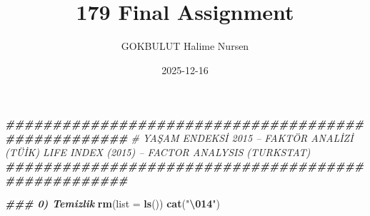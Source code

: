 \documentclass[
]{article}
\title{179 Final Assignment}
\author{GOKBULUT Halime Nursen}
\date{2025-12-16}
\newenvironment{Shaded}{\begin{snugshade}}{\end{snugshade}}
\newcommand{\AttributeTok}[1]{\textcolor[rgb]{0.13,0.29,0.53}{#1}}
\newcommand{\CommentTok}[1]{\textcolor[rgb]{0.56,0.35,0.01}{\textit{#1}}}
\newcommand{\DocumentationTok}[1]{\textcolor[rgb]{0.56,0.35,0.01}{\textbf{\textit{#1}}}}
\newcommand{\FunctionTok}[1]{\textcolor[rgb]{0.13,0.29,0.53}{\textbf{#1}}}
\newcommand{\NormalTok}[1]{#1}
\newcommand{\SpecialCharTok}[1]{\textcolor[rgb]{0.81,0.36,0.00}{\textbf{#1}}}
\newcommand{\StringTok}[1]{\textcolor[rgb]{0.31,0.60,0.02}{#1}}
\begin{document}
\maketitle

\begin{Shaded}
\begin{Highlighting}[]
\DocumentationTok{\#\#\#\#\#\#\#\#\#\#\#\#\#\#\#\#\#\#\#\#\#\#\#\#\#\#\#\#\#\#\#\#\#\#\#\#\#\#\#\#\#\#\#\#\#\#\#\#\#\#\#}
\CommentTok{\# YAŞAM ENDEKSİ 2015 – FAKTÖR ANALİZİ (TÜİK) LIFE INDEX (2015) – FACTOR ANALYSIS (TURKSTAT)}
\DocumentationTok{\#\#\#\#\#\#\#\#\#\#\#\#\#\#\#\#\#\#\#\#\#\#\#\#\#\#\#\#\#\#\#\#\#\#\#\#\#\#\#\#\#\#\#\#\#\#\#\#\#\#\#}

\DocumentationTok{\#\#\# 0) Temizlik}
\FunctionTok{rm}\NormalTok{(}\AttributeTok{list =} \FunctionTok{ls}\NormalTok{())}
\FunctionTok{cat}\NormalTok{(}\StringTok{"}\SpecialCharTok{\textbackslash{}014}\StringTok{"}\NormalTok{)}
\end{Highlighting}
\end{Shaded}

\newpage{}
\end{document}
